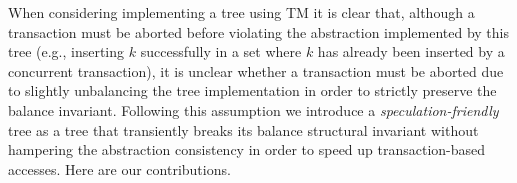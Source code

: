 \documentclass[runningheads,a4paper]{article}
\begin{document}
% 


When considering implementing a tree using TM it is clear that, although a transaction must be aborted before violating 
the abstraction implemented by this tree
(e.g., inserting $k$ successfully in a set where $k$ has already been inserted by a concurrent transaction),
it is unclear whether a transaction must be aborted due to
slightly unbalancing the tree implementation in order to strictly preserve the balance invariant.
Following this assumption we introduce a \emph{speculation-friendly} tree as a tree that transiently breaks its
balance structural invariant without hampering the abstraction consistency in order to speed up transaction-based accesses. 
Here are our contributions.
\end{document}
